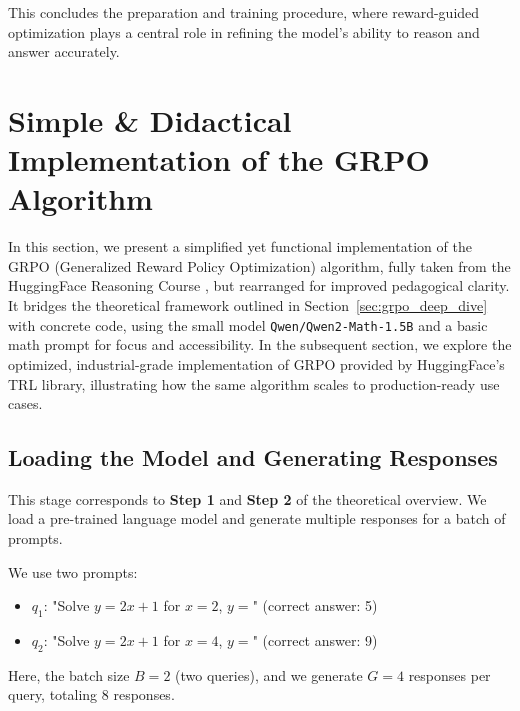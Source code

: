 \documentclass{article}
\begin{document}
\vspace{1em}
This concludes the preparation and training procedure, where reward-guided optimization plays a central role in refining the model’s ability to reason and answer accurately.


\section{Simple \& Didactical Implementation of the GRPO Algorithm}

In this section, we present a simplified yet functional implementation of the GRPO (Generalized Reward Policy Optimization) algorithm, fully taken from the HuggingFace Reasoning Course \citep{reasoning_course}, but rearranged for improved pedagogical clarity. It bridges the theoretical framework outlined in Section~\ref{sec:grpo_deep_dive} with concrete code, using the small model \texttt{Qwen/Qwen2-Math-1.5B} and a basic math prompt for focus and accessibility.
In the subsequent section, we explore the optimized, industrial-grade implementation of GRPO provided by HuggingFace's TRL library, illustrating how the same algorithm scales to production-ready use cases.


\subsection*{Loading the Model and Generating Responses}

This stage corresponds to \textbf{Step 1} and \textbf{Step 2} of the theoretical overview. We load a pre-trained language model and generate multiple responses for a batch of prompts.

We use two prompts:
\begin{itemize}
  \item \( q_1 \): "Solve \( y = 2x + 1 \) for \( x = 2 \), \( y = \)" (correct answer: 5)
  \item \( q_2 \): "Solve \( y = 2x + 1 \) for \( x = 4 \), \( y = \)" (correct answer: 9)
\end{itemize}

Here, the batch size \( B = 2 \) (two queries), and we generate \( G = 4 \) responses per query, totaling 8 responses.
\end{document}
